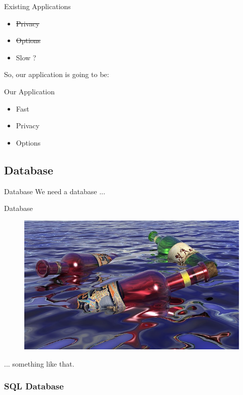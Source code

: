 \begin{frame}{Existing Applications}
\begin{itemize}
\item \sout{Privacy}
\item \sout{Options}
\item Slow ?
\end{itemize}
\end{frame}

So, our application is going to be:

\begin{frame}{Our Application}
\begin{itemize}
\item Fast
\item Privacy
\item Options
\end{itemize}
\end{frame}

\subsection{Database}
\begin{frame}{Database}
\centering
We need a database ...
\end{frame}

\begin{frame}{Database}
\begin{figure}[!ht]
\centering
\includegraphics[width=0.8\linewidth]{img/bottles.jpg}
\end{figure}
\end{frame}

... something like that.

\subsubsection{SQL Database}


